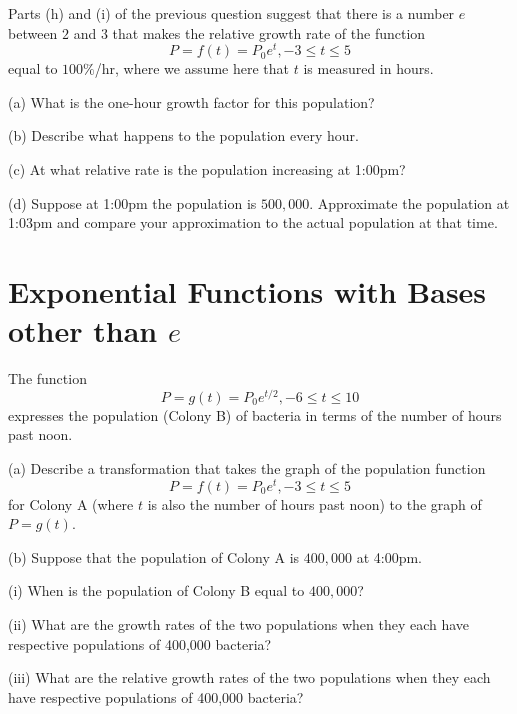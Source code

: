 \documentclass{ximera}
\begin{document}
\begin{question}  \label{Qcgbt4tt}
Parts (h) and (i) of the previous question suggest that there is a number $e$ between $2$ and $3$ that makes the 
relative growth rate of the function 
\[
         P = f(t) = P_0 e^t , -3\leq t \leq 5
\]
equal to $100\%$/hr, where we assume here that $t$ is measured in hours. 

(a) What is the one-hour growth factor for this population?

(b) Describe what happens to the population every hour.

(c) At what relative rate is the population increasing at 1:00pm?

(d) Suppose at 1:00pm the population is $500,000$. Approximate the population at 1:03pm and compare your approximation to the actual population at that time.
\end{question}


\section*{Exponential Functions with Bases other than $e$}


\begin{question}  \label{Qcgt4ghggyt4r}
The function
\[
     P = g(t) = P_0 e^{t/2}, -6 \leq t \leq 10
\]
expresses the population (Colony B) of bacteria in terms of the number of hours past noon.

(a) Describe a transformation that takes the graph of the population function 
\[
           P = f(t) = P_0 e^t , -3\leq t \leq 5 
\]
for Colony A (where $t$ is also the number of hours past noon) to the graph of $P=g(t)$.

(b) Suppose that the population of Colony A is $400,000$ at 4:00pm.

(i) When is the population of Colony B equal to $400,000$?

(ii) What are the growth rates of the two populations when they each have respective populations of 400,000 bacteria?

(iii) What are the relative growth rates of the two populations when they each have respective populations of 400,000 bacteria?

\end{question}
\end{document}
